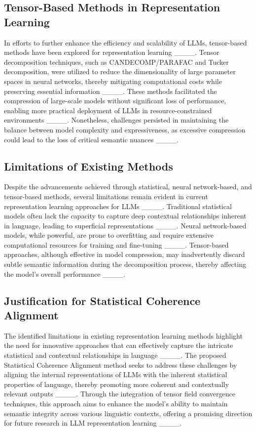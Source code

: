 \subsection{Tensor-Based Methods in Representation Learning}

In efforts to further enhance the efficiency and scalability of LLMs, tensor-based methods have been explored for representation learning ____. Tensor decomposition techniques, such as CANDECOMP/PARAFAC and Tucker decomposition, were utilized to reduce the dimensionality of large parameter spaces in neural networks, thereby mitigating computational costs while preserving essential information ____. These methods facilitated the compression of large-scale models without significant loss of performance, enabling more practical deployment of LLMs in resource-constrained environments ____. Nonetheless, challenges persisted in maintaining the balance between model complexity and expressiveness, as excessive compression could lead to the loss of critical semantic nuances ____.

\subsection{Limitations of Existing Methods}

Despite the advancements achieved through statistical, neural network-based, and tensor-based methods, several limitations remain evident in current representation learning approaches for LLMs ____. Traditional statistical models often lack the capacity to capture deep contextual relationships inherent in language, leading to superficial representations ____. Neural network-based models, while powerful, are prone to overfitting and require extensive computational resources for training and fine-tuning ____. Tensor-based approaches, although effective in model compression, may inadvertently discard subtle semantic information during the decomposition process, thereby affecting the model's overall performance ____.

\subsection{Justification for Statistical Coherence Alignment}

The identified limitations in existing representation learning methods highlight the need for innovative approaches that can effectively capture the intricate statistical and contextual relationships in language ____. The proposed Statistical Coherence Alignment method seeks to address these challenges by aligning the internal representations of LLMs with the inherent statistical properties of language, thereby promoting more coherent and contextually relevant outputs ____. Through the integration of tensor field convergence techniques, this approach aims to enhance the model's ability to maintain semantic integrity across various linguistic contexts, offering a promising direction for future research in LLM representation learning ____.